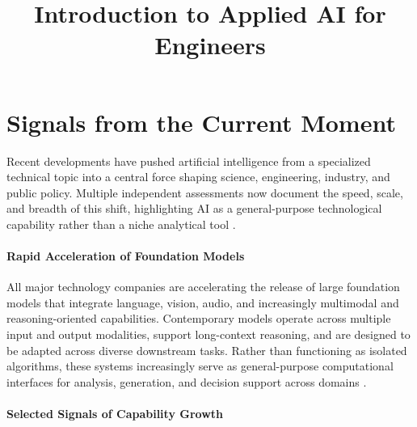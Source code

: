 \documentclass[12pt]{article}
\begin{document}
\doublespacing	

\title{Introduction to Applied AI for Engineers}
\author{}
\date{}
\maketitle


\section*{Signals from the Current Moment}

Recent developments have pushed artificial intelligence from a specialized technical topic into a central force shaping science, engineering, industry, and public policy. Multiple independent assessments now document the speed, scale, and breadth of this shift, highlighting AI as a general-purpose technological capability rather than a niche analytical tool \cite{stanford_ai_index_2024,crfm_fmti_2024}.


\paragraph{Rapid Acceleration of Foundation Models}

All major technology companies are accelerating the release of large foundation models that integrate language, vision, audio, and increasingly multimodal and reasoning-oriented capabilities. Contemporary models operate across multiple input and output modalities, support long-context reasoning, and are designed to be adapted across diverse downstream tasks. Rather than functioning as isolated algorithms, these systems increasingly serve as general-purpose computational interfaces for analysis, generation, and decision support across domains \cite{openai_gpt4o_system_card_2024,gemini_1_5_report_2024,anthropic_claude3_model_card_2024}.

\paragraph{Selected Signals of Capability Growth}
\end{document}

